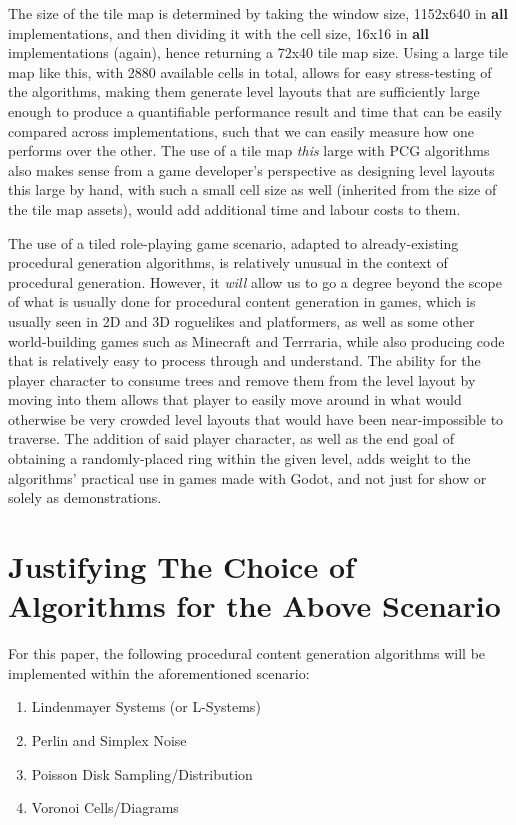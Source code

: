 The size of the tile map is determined by taking the window size, 1152x640 in \textbf{all} implementations, and then dividing it with the cell size, 16x16 in \textbf{all} implementations (again), hence returning a 72x40 tile map size. Using a large tile map like this, with 2880 available cells in total, allows for easy stress-testing of the algorithms, making them generate level layouts that are sufficiently large enough to produce a quantifiable performance result and time that can be easily compared across implementations, such that we can easily measure how one performs over the other. The use of a tile map \textit{this} large with PCG algorithms also makes sense from a game developer's perspective as designing level layouts this large by hand, with such a small cell size as well (inherited from the size of the tile map assets), would add additional time and labour costs to them. 

The use of a tiled role-playing game scenario, adapted to already-existing procedural generation algorithms, is relatively unusual in the context of procedural generation. However, it \textit{will} allow us to go a degree beyond the scope of what is usually done for procedural content generation in games, which is usually seen in 2D and 3D roguelikes and platformers, as well as some other world-building games such as Minecraft and Terrraria, while also producing code that is relatively easy to process through and understand. The ability for the player character to consume trees and remove them from the level layout by moving into them allows that player to easily move around in what would otherwise be very crowded level layouts that would have been near-impossible to traverse. The addition of said player character, as well as the end goal of obtaining a randomly-placed ring within the given level, adds weight to the algorithms' practical use in games made with Godot, and not just for show or solely as demonstrations. 

\section{Justifying The Choice of Algorithms for the Above Scenario}

For this paper, the following procedural content generation algorithms will be implemented within the aforementioned scenario:

\begin{enumerate}
    \item Lindenmayer Systems (or L-Systems)
    \item Perlin and Simplex Noise
    \item Poisson Disk Sampling/Distribution
    \item Voronoi Cells/Diagrams
\end{enumerate}

